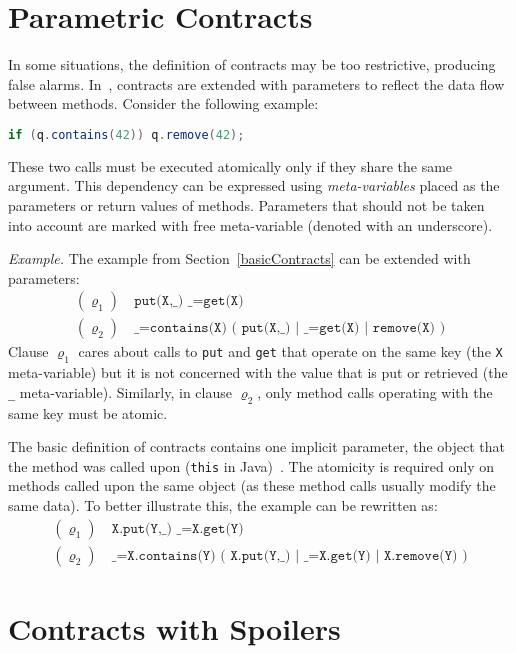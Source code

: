 \section{Parametric Contracts}
\label{parametricContracts}

In some situations, the definition of contracts may be too restrictive,
producing false alarms. In~\cite{contracts}, contracts are extended with
parameters to reflect the data flow between methods. Consider the following
example:
\begin{lstlisting}[language=java]
if (q.contains(42)) q.remove(42);
\end{lstlisting}

These two calls must be executed atomically only if they share the same
argument. This dependency can be expressed using \emph{meta-variables} placed as
the parameters or return values of methods. Parameters that should not be taken
into account are marked with free meta-variable (denoted with an underscore).

\emph{Example.} The example from Section~\ref{basicContracts} can be extended
with parameters:
\begin{align*}
    (\varrho_1) &\ \texttt{put(X,\_) \_=get(X)}\\
    (\varrho_2) &\ \texttt{\_=contains(X) ( put(X,\_) | \_=get(X) |
    remove(X) )}
\end{align*}
Clause $\varrho_1$ cares about calls to \texttt{put} and \texttt{get} that
operate on the same key (the \texttt{X} meta-variable) but it is not concerned
with the value that is put or retrieved (the \texttt{\_} meta-variable).
Similarly, in clause $\varrho_2$, only method calls operating with the same key
must be atomic.

The basic definition of contracts contains one implicit parameter, the object
that the method was called upon (\texttt{this} in Java)~\cite{FITPUB10817}. The
atomicity is required only on methods called upon the same object (as these
method calls usually modify the same data). To better illustrate this, the
example can be rewritten as:
\begin{align*}
    (\varrho_1) &\ \texttt{X.put(Y,\_) \_=X.get(Y)}\\
    (\varrho_2) &\ \texttt{\_=X.contains(Y) ( X.put(Y,\_) | \_=X.get(Y) |
    X.remove(Y) )}
\end{align*}


\section{Contracts with Spoilers}
\label{contractsWithSpoilers}

